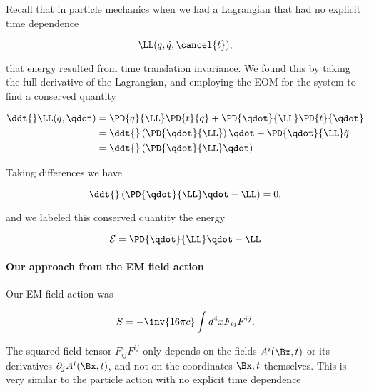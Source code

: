 Recall that in particle mechanics when we had a Lagrangian that had no explicit time dependence

\begin{equation}\label{eqn:relativisticElectrodynamicsL21b:380}
\LL(q, \dot{q}, \cancel{t}),
\end{equation}

that energy resulted from time translation invariance.  We found this by taking the full derivative of the Lagrangian, and employing the EOM for the system to find a conserved quantity

\begin{equation}\label{eqn:relativisticElectrodynamicsL21b:560}
\begin{aligned}
\ddt{} \LL(q, \qdot) 
&=
\PD{q}{\LL} \PD{t}{q}
+\PD{\qdot}{\LL} \PD{t}{\qdot} \\
&=
\ddt{} \left( \PD{\qdot}{\LL} \right) \qdot
+\PD{\qdot}{\LL} \ddot{q} \\
&=
\ddt{} \left( \PD{\qdot}{\LL} \qdot \right) 
\end{aligned}
\end{equation}

Taking differences we have

\begin{equation}\label{eqn:relativisticElectrodynamicsL21b:400}
\ddt{} \left( \PD{\qdot}{\LL} \qdot -\LL \right) = 0,
\end{equation}

and we labeled this conserved quantity the energy

\begin{equation}\label{eqn:relativisticElectrodynamicsL21b:420}
\mathcal{E} = \PD{\qdot}{\LL} \qdot -\LL 
\end{equation}

\paragraph{Our approach from the EM field action}

Our EM field action was

\begin{equation}\label{eqn:relativisticElectrodynamicsL21b:500}
S = -\inv{16 \pi c} \int d^4 x F_{i j} F^{i j}.
\end{equation}

The squared field tensor $F_{i j} F^{i j}$ only depends on the fields $A^i(\Bx, t)$ or its derivatives $\partial_j A^i(\Bx, t)$, and not on the coordinates $\Bx, t$ themselves.  This is very similar to the particle action with no explicit time dependence


